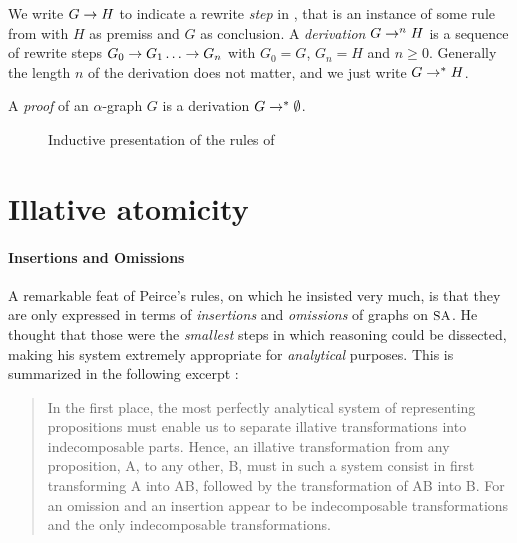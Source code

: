 \begin{definition}[Derivation]
  We write $G \rightarrow H$ to indicate a rewrite \emph{step} in , that is
  an instance of some rule from  with $H$ as premiss and $G$ as
  conclusion. A \emph{derivation} $G \rightarrow^{n} H$ is a sequence of rewrite
  steps $G_0 \rightarrow G_1 \ldots \rightarrow G_n$ with $G_0 = G$, $G_n = H$ and $n \geq
  0$. Generally the length $n$ of the derivation does not matter, and we just
  write $G \rightarrow^\ast H$.
\end{definition}

\begin{definition}[Proof]
  A \emph{proof} of an $\alpha$-graph $G$ is a derivation $G \rightarrow^\ast \emptyset$.
\end{definition}

\begin{figure}
  
  \caption{Inductive presentation of the rules of }
\end{figure}

\section{Illative atomicity}

\paragraph{Insertions and Omissions}

A remarkable feat of Peirce's rules, on which he insisted very much, is that
they are only expressed in terms of \emph{insertions} and \emph{omissions} of
graphs on $\small\textsc{SA}$. He thought that those were the \emph{smallest} steps in which
reasoning could be dissected, making his system extremely appropriate for
\emph{analytical} purposes. This is summarized in the following excerpt
:

\begin{quote}
  In the first place, the most perfectly analytical system of representing
propositions must enable us to separate illative transformations into
indecomposable parts. Hence, an illative transformation from any proposition, A,
to any other, B, must in such a system consist in first transforming A into AB,
followed by the transformation of AB into B. For an omission and an insertion
appear to be indecomposable transformations and the only indecomposable
transformations.
\end{quote}

